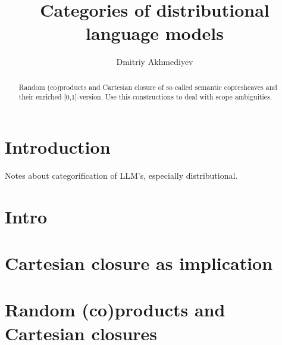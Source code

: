\documentclass{article}
\title{Categories of distributional language models}
\author{Dmitriy Akhmediyev}
\begin{document}
\maketitle

\begin{abstract}
Random (co)products and Cartesian closure of so called semantic copresheaves and their enriched [0,1]-version.
Use this constructions to deal with scope ambiguities.
\end{abstract}

\section{Introduction}

Notes about categorification of LLM's, especially distributional.

\section{Intro}

\section{Cartesian closure as implication}

\section{Random (co)products and Cartesian closures}
\end{document}
